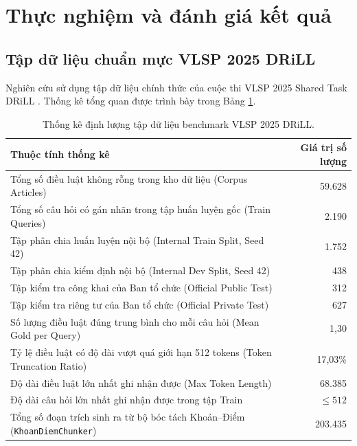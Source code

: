 \documentclass[12pt,a4paper]{article}
\begin{document}
\section{Thực nghiệm và đánh giá kết quả}

\subsection{Tập dữ liệu chuẩn mực VLSP 2025 DRiLL}
Nghiên cứu sử dụng tập dữ liệu chính thức của cuộc thi VLSP 2025 Shared Task DRiLL \cite{vlsp2025drill}. Thống kê tổng quan được trình bày trong Bảng \ref{tab:dataset_stats}.

\begin{table}[htbp]
\centering
\caption{Thống kê định lượng tập dữ liệu benchmark VLSP 2025 DRiLL.}
\label{tab:dataset_stats}
\footnotesize
\begin{tabularx}{\textwidth}{X r}
\toprule
\textbf{Thuộc tính thống kê} & \textbf{Giá trị số lượng} \\
\midrule
Tổng số điều luật không rỗng trong kho dữ liệu (Corpus Articles) & 59.628 \\
Tổng số câu hỏi có gán nhãn trong tập huấn luyện gốc (Train Queries) & 2.190 \\
Tập phân chia huấn luyện nội bộ (Internal Train Split, Seed 42) & 1.752 \\
Tập phân chia kiểm định nội bộ (Internal Dev Split, Seed 42) & 438 \\
Tập kiểm tra công khai của Ban tổ chức (Official Public Test) & 312 \\
Tập kiểm tra riêng tư của Ban tổ chức (Official Private Test) & 627 \\
Số lượng điều luật đúng trung bình cho mỗi câu hỏi (Mean Gold per Query) & 1,30 \\
Tỷ lệ điều luật có độ dài vượt quá giới hạn 512 tokens (Token Truncation Ratio) & 17,03\% \\
Độ dài điều luật lớn nhất ghi nhận được (Max Token Length) & 68.385 \\
Độ dài câu hỏi lớn nhất ghi nhận được trong tập Train & $\le 512$ \\
Tổng số đoạn trích sinh ra từ bộ bóc tách Khoản--Điểm (\texttt{KhoanDiemChunker}) & 203.435 \\
\bottomrule
\end{tabularx}
\end{table}
\end{document}
